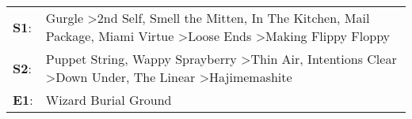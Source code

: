\begin{supertabular}{p{0.03\textwidth}p{0.92\textwidth}}
 \textbf{S1}:  &  Gurgle\textsuperscript{} \textgreater \enspace 2nd Self\textsuperscript{}, \enspace Smell the Mitten\textsuperscript{}, \enspace In The Kitchen\textsuperscript{}, \enspace Mail Package\textsuperscript{}, \enspace Miami Virtue\textsuperscript{} \textgreater \enspace Loose Ends\textsuperscript{} \textgreater \enspace Making Flippy Floppy\textsuperscript{}  \enspace  \\
 \textbf{S2}:  &                                           Puppet String\textsuperscript{}, \enspace Wappy Sprayberry\textsuperscript{} \textgreater \enspace Thin Air\textsuperscript{}, \enspace Intentions Clear\textsuperscript{} \textgreater \enspace Down Under\textsuperscript{}, \enspace The Linear\textsuperscript{} \textgreater \enspace Hajimemashite\textsuperscript{}  \enspace  \\
 \textbf{E1}:  &                                                                                                                                                                                                                                                                                                                               Wizard Burial Ground\textsuperscript{}  \enspace  \\
\end{supertabular}
